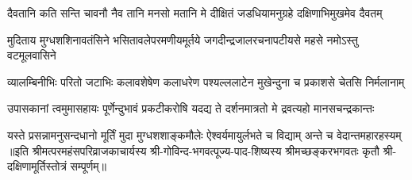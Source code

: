 \fourlineindentedshloka
{दैवतानि कति सन्ति चावनौ}
{नैव तानि मनसो मतानि मे}
{दीक्षितं जडधियामनुग्रहे}
{दक्षिणाभिमुखमेव दैवतम्}

\fourlineindentedshloka
{मुदिताय मुग्धशशिनावतंसिने}
{भसितावलेपरमणीयमूर्तये}
{जगदीन्द्रजालरचनापटीयसे}
{महसे नमोऽस्तु वटमूलवासिने}

\fourlineindentedshloka
{व्यालम्बिनीभिः परितो जटाभिः}
{कलावशेषेण कलाधरेण}
{पश्यल्ललाटेन मुखेन्दुना च}
{प्रकाशसे चेतसि निर्मलानाम्}

\fourlineindentedshloka
{उपासकानां त्वमुमासहायः}
{पूर्णेन्दुभावं प्रकटीकरोषि}
{यदद्य ते दर्शनमात्रतो मे}
{द्रवत्यहो मानसचन्द्रकान्तः}

\fourlineindentedshloka
{यस्ते प्रसन्नामनुसन्दधानो}
{मूर्तिं मुदा मुग्धशशाङ्कमौलेः}
{ऐश्वर्यमायुर्लभते च विद्याम्}
{अन्ते च वेदान्तमहारहस्यम्}
॥इति श्रीमत्परमहंसपरिव्राजकाचार्यस्य श्री-गोविन्द-भगवत्पूज्य-पाद-शिष्यस्य 
श्रीमच्छङ्करभगवतः कृतौ श्री-दक्षिणामूर्तिस्तोत्रं सम्पूर्णम्॥